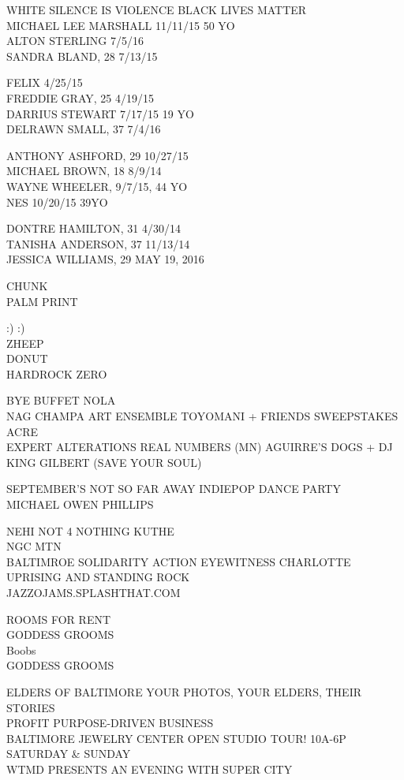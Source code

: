 \documentclass[10pt,letterpaper]{article}
\begin{document}
WHITE SILENCE IS VIOLENCE BLACK LIVES MATTER\\
MICHAEL LEE MARSHALL 11/11/15 50 YO\\
ALTON STERLING 7/5/16\\
SANDRA BLAND, 28 7/13/15

FELIX 4/25/15\\
FREDDIE GRAY, 25 4/19/15\\
DARRIUS STEWART 7/17/15 19 YO\\
DELRAWN SMALL, 37 7/4/16

ANTHONY ASHFORD, 29 10/27/15\\
MICHAEL BROWN, 18 8/9/14\\
WAYNE WHEELER, 9/7/15, 44 YO\\
NES 10/20/15 39YO

DONTRE HAMILTON, 31 4/30/14\\
TANISHA ANDERSON, 37 11/13/14\\
JESSICA WILLIAMS, 29 MAY 19, 2016

CHUNK\\
PALM PRINT

:) :)\\
ZHEEP\\
DONUT\\
HARDROCK ZERO

BYE BUFFET NOLA\\
NAG CHAMPA ART ENSEMBLE TOYOMANI + FRIENDS SWEEPSTAKES\\
ACRE\\
EXPERT ALTERATIONS REAL NUMBERS (MN) AGUIRRE'S DOGS + DJ KING GILBERT (SAVE YOUR SOUL)

SEPTEMBER'S NOT SO FAR AWAY INDIEPOP DANCE PARTY\\
MICHAEL OWEN PHILLIPS

NEHI NOT 4 NOTHING KUTHE\\
NGC MTN\\
BALTIMROE SOLIDARITY ACTION EYEWITNESS CHARLOTTE UPRISING AND STANDING ROCK\\
JAZZOJAMS.SPLASHTHAT.COM

ROOMS FOR RENT\\
GODDESS GROOMS\\
Boobs\\
GODDESS GROOMS

ELDERS OF BALTIMORE YOUR PHOTOS, YOUR ELDERS, THEIR STORIES\\
PROFIT PURPOSE{-}DRIVEN BUSINESS\\
BALTIMORE JEWELRY CENTER OPEN STUDIO TOUR!  10A{-}6P SATURDAY \& SUNDAY\\
WTMD PRESENTS AN EVENING WITH SUPER CITY
\end{document}

